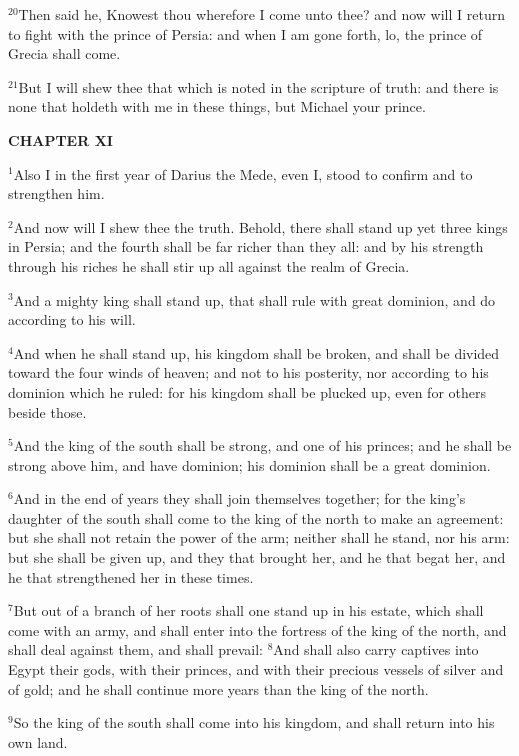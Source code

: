 \documentclass[12pt]{article}
\begin{document}
$^{20}$Then said he, Knowest thou wherefore I come unto thee? and now
will I return to fight with the prince of Persia: and when I am gone
forth, lo, the prince of Grecia shall come.


$^{21}$But I will shew thee that which is noted in the scripture of
truth: and there is none that holdeth with me in these things, but
Michael your prince.





\begin{center}
\textbf{\small CHAPTER XI}
\end{center}
$^{1}$Also I in the first year of Darius the Mede, even I, stood to
confirm and to strengthen him.


$^{2}$And now will I shew thee the truth. Behold, there shall stand up
yet three kings in Persia; and the fourth shall be far richer than
they all: and by his strength through his riches he shall stir up all
against the realm of Grecia.


$^{3}$And a mighty king shall stand up, that shall rule with great
dominion, and do according to his will.


$^{4}$And when he shall stand up, his kingdom shall be broken, and
shall be divided toward the four winds of heaven; and not to his
posterity, nor according to his dominion which he ruled: for his
kingdom shall be plucked up, even for others beside those.


$^{5}$And the king of the south shall be strong, and one of his
princes; and he shall be strong above him, and have dominion; his
dominion shall be a great dominion.


$^{6}$And in the end of years they shall join themselves together; for
the king's daughter of the south shall come to the king of the north
to make an agreement: but she shall not retain the power of the arm;
neither shall he stand, nor his arm: but she shall be given up, and
they that brought her, and he that begat her, and he that strengthened
her in these times.


$^{7}$But out of a branch of her roots shall one stand up in his
estate, which shall come with an army, and shall enter into the
fortress of the king of the north, and shall deal against them, and
shall prevail: $^{8}$And shall also carry captives into Egypt their
gods, with their princes, and with their precious vessels of silver
and of gold; and he shall continue more years than the king of the
north.


$^{9}$So the king of the south shall come into his kingdom, and shall
return into his own land.
\end{document}
